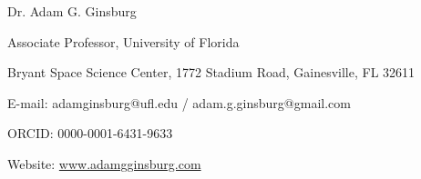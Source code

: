 \begin{center}
{\large Dr. Adam G. Ginsburg}\\
\par Associate Professor, University of Florida
\par Bryant Space Science Center,
1772 Stadium Road,
Gainesville, FL 32611
\par E-mail: adamginsburg@ufl.edu / adam.g.ginsburg@gmail.com
\par ORCID: 0000-0001-6431-9633
\par Website: \url{www.adamgginsburg.com}
\end{center}

